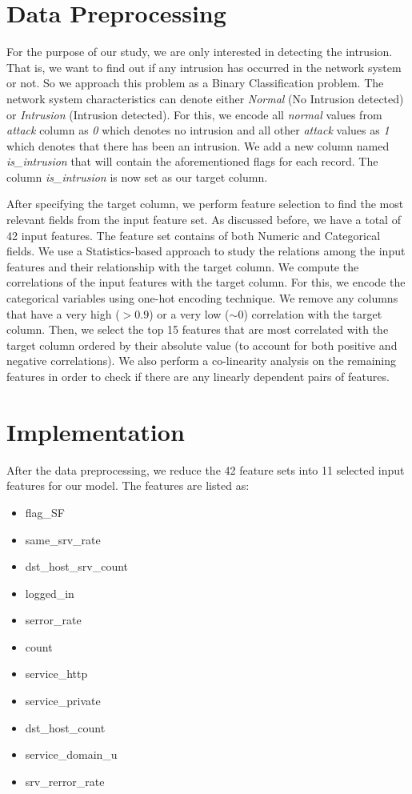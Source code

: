 \documentclass[conference]{IEEEtran}
\begin{document}
\section{Data Preprocessing}
For the purpose of our study, we are only interested in detecting the intrusion. That is, we want to find out if any intrusion has occurred in the network system or not. So we approach this problem as a Binary Classification problem. The network system characteristics can denote either \emph{Normal} (No Intrusion detected) or \emph{Intrusion} (Intrusion detected). For this, we encode all \emph{normal} values from \emph{attack} column as \emph{0} which denotes no intrusion and all other \emph{attack} values as \emph{1} which denotes that there has been an intrusion. We add a new column named \emph{is\_intrusion} that will contain the aforementioned flags for each record. The column \emph{is\_intrusion} is now set as our target column.

After specifying the target column, we perform feature selection to find the most relevant fields from the input feature set. As discussed before, we have a total of 42 input features. The feature set contains of both Numeric and Categorical fields. We use a Statistics-based approach to study the relations among the input features and their relationship with the target column. We compute the correlations of the input features with the target column. For this, we encode the categorical variables using one-hot encoding technique. We remove any columns that have a very high ($>0.9$) or a very low ($\sim 0$) correlation with the target column. Then, we select the top 15 features that are most correlated with the target column ordered by their absolute value (to account for both positive and negative correlations). We also perform a co-linearity analysis on the remaining features in order to check if there are any linearly dependent pairs of features.

\section{Implementation}
After the data preprocessing, we reduce the 42 feature sets into 11 selected input features for our model. The features are listed as:
\begin{itemize}
\item flag\_SF
\item same\_srv\_rate
\item dst\_host\_srv\_count
\item logged\_in
\item serror\_rate
\item count
\item service\_http
\item service\_private
\item dst\_host\_count
\item service\_domain\_u
\item srv\_rerror\_rate
\end{itemize}
\end{document}
